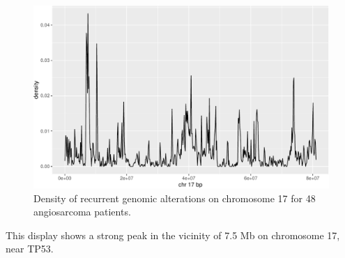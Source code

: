 \begin{figure}
\includegraphics[width=1\linewidth,]{bioccb_files/figure-latex/mkden-1} \caption{Density of recurrent genomic alterations on chromosome 17 for 48 angiosarcoma patients.}\label{fig:mkden}
\end{figure}

This display shows a strong peak in the vicinity of 7.5 Mb on chromosome 17, near TP53.

